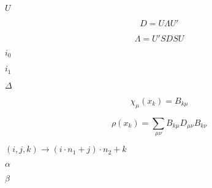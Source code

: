 \documentclass{article}
\begin{document}
$ U $
\pagebreak

\[ D = U \Lambda U' \]
\pagebreak

\[ \Lambda = U' S D S U \]
\pagebreak

$ i_0 $
\pagebreak

$ i_1 $
\pagebreak

$ \Delta $
\pagebreak

\[ \chi_\mu(x_k) = B_{k\mu} \]
\pagebreak

\[ \rho(x_k) = \sum_{\mu\nu} B_{k\mu}D_{\mu\nu}B_{k\nu} \]
\pagebreak

$ (i,j,k) \rightarrow (i\cdot n_1 + j) \cdot n_2 + k $
\pagebreak

$ \alpha $
\pagebreak

$ \beta $
\pagebreak
\end{document}
